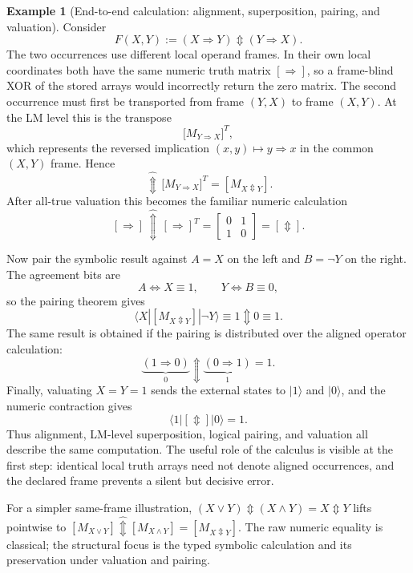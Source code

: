 \documentclass[11pt]{article}
\theoremstyle{definition}
\newtheorem{example}[theorem]{Example}
\theoremstyle{remark}
\newcommand{\xor}{\mathbin{\Updownarrow}}
\begin{document}
\begin{example}[End-to-end calculation: alignment, superposition, pairing, and valuation]
\label{ex:endtoend}
Consider
\[
 F(X,Y):=(X\Rightarrow Y)\xor(Y\Rightarrow X).
\]
The two occurrences use different local operand frames.  In their own local coordinates both have the same numeric truth matrix $[\Rightarrow]$, so a frame-blind XOR of the stored arrays would incorrectly return the zero matrix.  The second occurrence must first be transported from frame $(Y,X)$ to frame $(X,Y)$.  At the LM level this is the transpose
\[
 \bigl[M_{Y\Rightarrow X}\bigr]^T,
\]
which represents the reversed implication $(x,y)\mapsto y\Rightarrow x$ in the common $(X,Y)$ frame.  Hence
\begin{equation}
 [M_{X\Rightarrow Y}]
 \,\widehat{\Updownarrow}\,
 \bigl[M_{Y\Rightarrow X}\bigr]^T
 = [M_{X\Updownarrow Y}].
 \label{eq:endtoend-superposition}
\end{equation}
After all-true valuation this becomes the familiar numeric calculation
\[
 [\Rightarrow] \,\widehat{\Updownarrow}\, [\Rightarrow]^T
 =\begin{bmatrix}0&1\\1&0\end{bmatrix}
 =[\Updownarrow].
\]

Now pair the symbolic result against $A=X$ on the left and $B=\neg Y$ on the right.  The agreement bits are
\[
 A\Leftrightarrow X\equiv1,
 \qquad
 Y\Leftrightarrow B\equiv0,
\]
so the pairing theorem gives
\[
 \langle X|[M_{X\Updownarrow Y}]|\neg Y\rangle
 \equiv 1\xor0
 \equiv1.
\]
The same result is obtained if the pairing is distributed over the aligned operator calculation:
\[
 \underbrace{(1\Rightarrow0)}_{0}
 \xor
 \underbrace{(0\Rightarrow1)}_{1}
 =1.
\]
Finally, valuating $X=Y=1$ sends the external states to $|1\rangle$ and $|0\rangle$, and the numeric contraction gives
\[
 \langle1|[\Updownarrow]|0\rangle=1.
\]
Thus alignment, LM-level superposition, logical pairing, and valuation all describe the same computation.  The useful role of the calculus is visible at the first step: identical local truth arrays need not denote aligned occurrences, and the declared frame prevents a silent but decisive error.
\end{example}

For a simpler same-frame illustration, $(X\lor Y)\xor(X\land Y)=X\xor Y$ lifts pointwise to $[M_{X\lor Y}]\widehat{\Updownarrow}[M_{X\land Y}]=[M_{X\Updownarrow Y}]$.  The raw numeric equality is classical; the structural focus is the typed symbolic calculation and its preservation under valuation and pairing.
\end{document}
